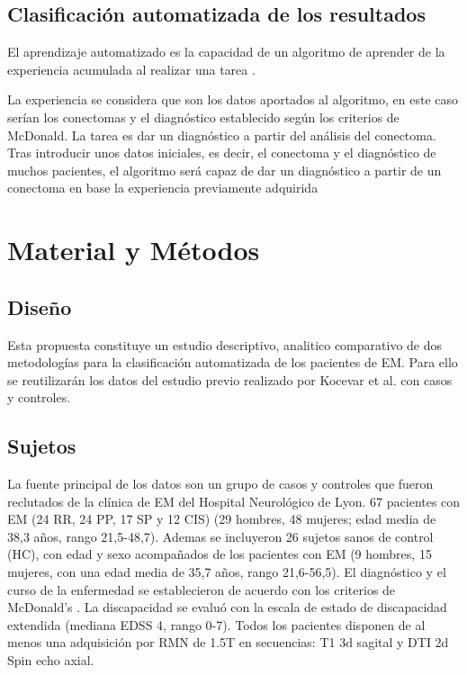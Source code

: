 \documentclass[fleqn,10pt]{UICArticle} %
\begin{document}
\subsection{Clasificación automatizada de los resultados}

El aprendizaje automatizado es la capacidad de un algoritmo de aprender de la experiencia acumulada al realizar una tarea \cite{Friedman1997}.


La experiencia se considera que son los datos aportados al algoritmo, en este caso serían los conectomas y el diagnóstico establecido según los criterios de McDonald. La tarea es dar un diagnóstico a partir del análisis del conectoma. Tras introducir unos datos iniciales, es decir, el conectoma y el diagnóstico de muchos pacientes, el algoritmo será capaz de dar un diagnóstico a partir de un conectoma en base la experiencia previamente adquirida

\section{Material y Métodos}

\subsection{Diseño}

Esta propuesta constituye un estudio descriptivo, analitico comparativo de dos metodologías para la clasificación automatizada de los pacientes de EM. Para ello se reutilizarán los datos del estudio previo realizado por Kocevar et al. \cite{Kocevar2016} con casos y controles.

\subsection{Sujetos}
La fuente principal de los datos son un grupo de casos y controles que fueron reclutados de la clínica de EM del Hospital Neurológico de Lyon. 67 pacientes con EM (24 RR, 24 PP, 17 SP y 12 CIS) (29 hombres, 48 mujeres; edad media de 38,3 años, rango 21,5-48,7). Ademas se incluyeron 26 sujetos sanos de control (HC), con edad y sexo acompañados de los pacientes con EM (9 hombres, 15 mujeres, con una edad media de 35,7 años, rango 21,6-56,5). El diagnóstico y el curso de la enfermedad se establecieron de acuerdo con los criterios de McDonald's \cite{Polman2011}. La discapacidad se evaluó con la escala de estado de discapacidad extendida (mediana EDSS 4, rango 0-7). Todos los pacientes disponen de al menos una adquisición por RMN de 1.5T en secuencias: T1 3d sagital y DTI 2d Spin echo axial.
\end{document}
